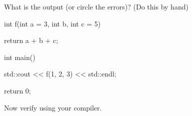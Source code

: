 What is the output (or circle the errors)? (Do this by hand)



\begin{consolethree}[escapeinside=||]

int f(int a = 3, int b, int c = 5)

{

    return a + b + c;

}



int main()

{

    std::cout << f(1, 2, 3) << std::endl;

    return 0;

}

\end{consolethree}



Now verify using your compiler.

